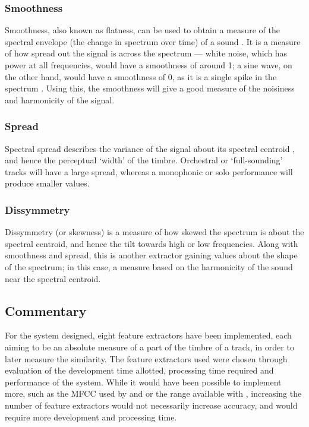 \subsubsection{Smoothness}

Smoothness, also known as flatness, can be used to obtain a measure of the spectral envelope (the change in spectrum over time) of a sound \citep{Klapuri2003}. It is a measure of how spread out the signal is across the spectrum --- white noise, which has power at all frequencies, would have a smoothness of around 1; a sine wave, on the other hand, would have a smoothness of 0, as it is a single spike in the spectrum \citep{Peeters2004}. Using this, the smoothness will give a good measure of the noisiness and harmonicity of the signal.
\subsubsection{Spread}

Spectral spread describes the variance of the signal about its spectral centroid \citep{Peeters2004}, and hence the perceptual `width' of the timbre. Orchestral or `full-sounding' tracks will have a large spread, whereas a monophonic or solo performance will produce smaller values.
\subsubsection{Dissymmetry}

Dissymmetry (or skewness) is a measure of how skewed the spectrum is about the spectral centroid, and hence the tilt towards high or low frequencies. Along with smoothness and spread, this is another extractor gaining values about the shape of the spectrum; in this case, a measure based on the harmonicity of the sound near the spectral centroid.
\subsection{Commentary}
For the system designed, eight feature extractors have been implemented, each aiming to be an absolute measure of a part of the timbre of a track, in order to later measure the similarity. The feature extractors used were chosen through evaluation of the development time allotted, processing time required and performance of the system. While it would have been possible to implement more, such as the MFCC used by \citet{Schnitzer2003} and \citet{Aucouturier2002a} or the range available with , increasing the number of feature extractors would not necessarily increase accuracy, and would require more development and processing time.
